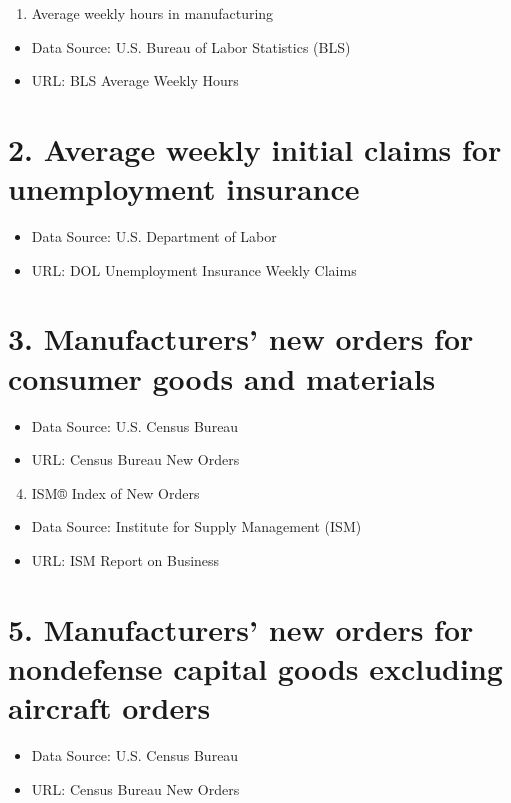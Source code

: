 \documentclass[10pt]{article}
\begin{document}
\begin{enumerate}
  \item Average weekly hours in manufacturing
\end{enumerate}

\begin{itemize}
  \item Data Source: U.S. Bureau of Labor Statistics (BLS)
  \item URL: BLS Average Weekly Hours
\end{itemize}

\section*{2. Average weekly initial claims for unemployment insurance}
\begin{itemize}
  \item Data Source: U.S. Department of Labor
  \item URL: DOL Unemployment Insurance Weekly Claims
\end{itemize}

\section*{3. Manufacturers' new orders for consumer goods and materials}
\begin{itemize}
  \item Data Source: U.S. Census Bureau
  \item URL: Census Bureau New Orders
\end{itemize}

\begin{enumerate}
  \setcounter{enumi}{3}
  \item ISM® Index of New Orders
\end{enumerate}

\begin{itemize}
  \item Data Source: Institute for Supply Management (ISM)
  \item URL: ISM Report on Business
\end{itemize}

\section*{5. Manufacturers' new orders for nondefense capital goods excluding aircraft orders}
\begin{itemize}
  \item Data Source: U.S. Census Bureau
  \item URL: Census Bureau New Orders
\end{itemize}
\end{document}

